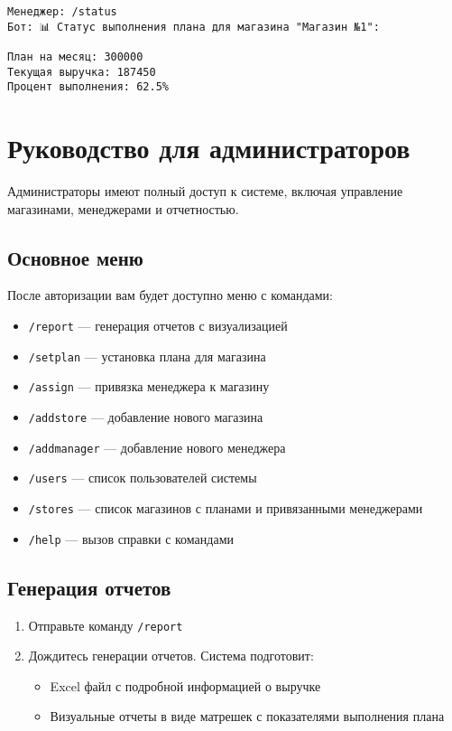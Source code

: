 \documentclass[a4paper,12pt]{article}
\begin{document}
\begin{tcolorbox}[colback=blue!5, title=Пример просмотра статуса]
\begin{verbatim}
Менеджер: /status
Бот: 📊 Статус выполнения плана для магазина "Магазин №1":

План на месяц: 300000
Текущая выручка: 187450
Процент выполнения: 62.5%
\end{verbatim}
\end{tcolorbox}

\section{Руководство для администраторов}

Администраторы имеют полный доступ к системе, включая управление магазинами, менеджерами и отчетностью.

\subsection{Основное меню}
После авторизации вам будет доступно меню с командами:
\begin{itemize}
    \item \texttt{/report} — генерация отчетов с визуализацией
    \item \texttt{/setplan} — установка плана для магазина
    \item \texttt{/assign} — привязка менеджера к магазину
    \item \texttt{/addstore} — добавление нового магазина
    \item \texttt{/addmanager} — добавление нового менеджера
    \item \texttt{/users} — список пользователей системы
    \item \texttt{/stores} — список магазинов с планами и привязанными менеджерами
    \item \texttt{/help} — вызов справки с командами
\end{itemize}

\subsection{Генерация отчетов}
\begin{enumerate}
    \item Отправьте команду \texttt{/report}
    \item Дождитесь генерации отчетов. Система подготовит:
    \begin{itemize}
        \item Excel файл с подробной информацией о выручке
        \item Визуальные отчеты в виде матрешек с показателями выполнения плана
    \end{itemize}
\end{enumerate}
\end{document}
